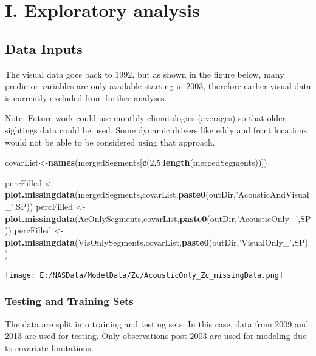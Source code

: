 \documentclass[11pt,]{article}
\newenvironment{Shaded}{\begin{snugshade}}{\end{snugshade}}
\newcommand{\KeywordTok}[1]{\textcolor[rgb]{0.13,0.29,0.53}{\textbf{{#1}}}}
\newcommand{\DecValTok}[1]{\textcolor[rgb]{0.00,0.00,0.81}{{#1}}}
\newcommand{\StringTok}[1]{\textcolor[rgb]{0.31,0.60,0.02}{{#1}}}
\newcommand{\NormalTok}[1]{{#1}}
\begin{document}
\section{I. Exploratory analysis}\label{i.-exploratory-analysis}

\subsection{Data Inputs}\label{data-inputs}

The visual data goes back to 1992, but as shown in the figure below,
many predictor variables are only available starting in 2003, therefore
earlier visual data is currently excluded from further analyses.

Note: Future work could use monthly climatologies (averages) so that
older sightings data could be used. Some dynamic drivers like eddy and
front locations would not be able to be considered using that approach.

\begin{Shaded}
\begin{Highlighting}[]
\NormalTok{covarList<-}\KeywordTok{names}\NormalTok{(mergedSegments[}\KeywordTok{c}\NormalTok{(}\DecValTok{2}\NormalTok{,}\DecValTok{5}\NormalTok{:}\KeywordTok{length}\NormalTok{(mergedSegments))])}

\NormalTok{percFilled <-}\StringTok{ }\KeywordTok{plot.missingdata}\NormalTok{(mergedSegments,covarList,}\KeywordTok{paste0}\NormalTok{(outDir,}\StringTok{'AcousticAndVisual_'}\NormalTok{,SP)) }
\NormalTok{percFilled <-}\StringTok{ }\KeywordTok{plot.missingdata}\NormalTok{(AcOnlySegments,covarList,}\KeywordTok{paste0}\NormalTok{(outDir,}\StringTok{'AcousticOnly_'}\NormalTok{,SP)) }
\NormalTok{percFilled <-}\StringTok{ }\KeywordTok{plot.missingdata}\NormalTok{(VisOnlySegments,covarList,}\KeywordTok{paste0}\NormalTok{(outDir,}\StringTok{'VisualOnly_'}\NormalTok{,SP)) }
\end{Highlighting}
\end{Shaded}

\texttt{[image: E:/NASData/ModelData/Zc/AcousticOnly\_Zc\_missingData.png]}

\subsubsection{Testing and Training
Sets}\label{testing-and-training-sets}

The data are split into training and testing sets. In this case, data
from 2009 and 2013 are used for testing. Only observations post-2003 are
used for modeling due to covariate limitations.
\end{document}
